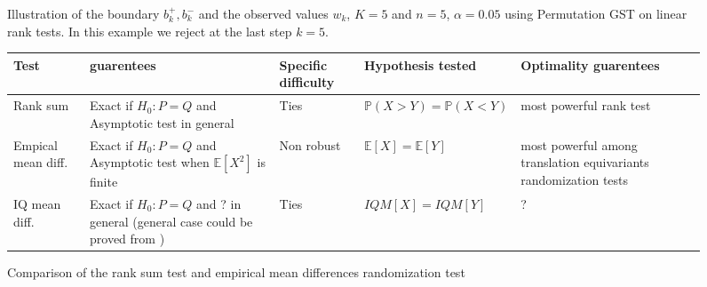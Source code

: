 \documentclass{article}
\theoremstyle{plain}
\theoremstyle{remark}
\renewcommand{\P}{\mathbb{P}}
\newcommand{\E}{\mathbb{E}}
\newcommand{\1}{\mathbbm{1}}
\newcommand{\todoT}[1]{\todo[inline,color=blue!40]{{\textbf{T:}~}#1}}
\numberwithin{equation}{section}
\begin{document}
\begin{figure}
\begin{center}

\caption{Illustration of the boundary $b_k^+, b_k^-$ and the observed values $w_k$, $K=5$ and $n=5$, $\alpha=0.05$ using Permutation GST on linear rank tests. In this example we reject at the last step $k=5$. \label{fig:gst}}
\end{center}
\end{figure}
\begin{figure}[h]
\begin{center}
\begin{tabular}{ | L{4em} | L{7em} |  L{5em}| l | L{9em} | }
\hline
Test & guarentees & Specific difficulty &  Hypothesis tested & Optimality guarentees \\
\hline
Rank sum & Exact if $H_0:P=Q$ and Asymptotic test in general \cite{Janssen_1999,Chung_2013}  & Ties  &  $\P(X>Y) = \P(X<Y)$ & most powerful rank test \cite{Pratt_1981}\\
\hline
Empical mean diff. & Exact if  $H_0:P=Q$ and Asymptotic test when $\E[X^2]$ is finite \cite{Romano_1990,Chung_2013} & Non robust &  $\E[X]=\E[Y] $&most powerful among translation equivariants randomization tests \cite{Pratt_1981}\\
\hline
IQ mean diff. & Exact if  $H_0:P=Q$ and ? in general (general case could be proved from \cite{lehmann2005testing,Chung_2013})& Ties  &  $IQM[X]=IQM[Y] $& ?\\
\hline
\end{tabular}
\end{center}
\caption{Comparison of the rank sum test and empirical mean differences randomization test}
\end{figure}
\end{document}
